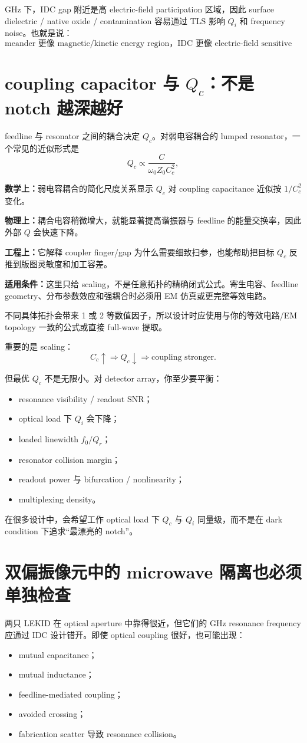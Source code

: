 \documentclass[11pt,a4paper,openany]{ctexrep}
\newcommand{\formulaexplain}[4]{%
\begin{formulaguidebox}
\textbf{\color{KidBlue}数学上：}#1\par
\textbf{\color{KidTeal}物理上：}#2\par
\textbf{\color{KidGold!55!black}工程上：}#3\par
\textbf{\color{KidRed}适用条件：}#4
\end{formulaguidebox}%
}
\begin{document}
GHz 下，IDC gap 附近是高 electric-field participation 区域，因此 surface dielectric / native oxide / contamination 容易通过 TLS 影响 $Q_i$ 和 frequency noise。也就是说：
\[
\boxed{
\text{meander 更像 magnetic/kinetic energy region，IDC 更像 electric-field sensitive region。}
}
\]

\section{coupling capacitor 与 $Q_c$：不是 notch 越深越好}

feedline 与 resonator 之间的耦合决定 $Q_c$。对弱电容耦合的 lumped resonator，一个常见的近似形式是
\[
Q_c\propto\frac{C}{\omega_0 Z_0 C_c^2},
\]
\formulaexplain
{弱电容耦合的简化尺度关系显示 $Q_c$ 对 coupling capacitance 近似按 $1/C_c^2$ 变化。}
{耦合电容稍微增大，就能显著提高谐振器与 feedline 的能量交换率，因此外部 $Q$ 会快速下降。}
{它解释 coupler finger/gap 为什么需要细致扫参，也能帮助把目标 $Q_c$ 反推到版图灵敏度和加工容差。}
{这里只给 scaling，不是任意拓扑的精确闭式公式。寄生电容、feedline geometry、分布参数效应和强耦合时必须用 EM 仿真或更完整等效电路。}
不同具体拓扑会带来 1 或 2 等数值因子，所以设计时应使用与你的等效电路/EM topology 一致的公式或直接 full-wave 提取。

重要的是 scaling：
\[
C_c\uparrow\Rightarrow Q_c\downarrow\Rightarrow\text{coupling stronger}.
\]

但最优 $Q_c$ 不是无限小。对 detector array，你至少要平衡：
\begin{itemize}
  \item resonance visibility / readout SNR；
  \item optical load 下 $Q_i$ 会下降；
  \item loaded linewidth $f_0/Q_r$；
  \item resonator collision margin；
  \item readout power 与 bifurcation / nonlinearity；
  \item multiplexing density。
\end{itemize}

在很多设计中，会希望工作 optical load 下 $Q_c$ 与 $Q_i$ 同量级，而不是在 dark condition 下追求“最漂亮的 notch”。

\section{双偏振像元中的 microwave 隔离也必须单独检查}

两只 LEKID 在 optical aperture 中靠得很近，但它们的 GHz resonance frequency 应通过 IDC 设计错开。即使 optical coupling 很好，也可能出现：
\begin{itemize}
  \item mutual capacitance；
  \item mutual inductance；
  \item feedline-mediated coupling；
  \item avoided crossing；
  \item fabrication scatter 导致 resonance collision。
\end{itemize}
\end{document}
